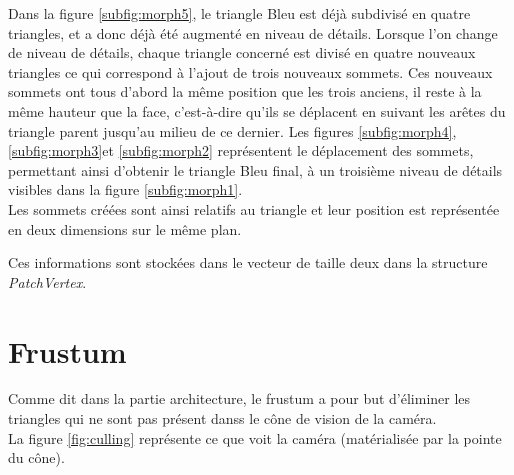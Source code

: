     Dans la figure \ref{subfig:morph5}, le triangle Bleu est déjà subdivisé en quatre triangles, et a donc déjà été augmenté en niveau de détails.
    Lorsque l'on change de niveau de détails, chaque triangle concerné est divisé en quatre nouveaux triangles ce qui correspond à l'ajout de trois nouveaux sommets. Ces nouveaux sommets ont tous d'abord la même position que les trois anciens, il reste à la même hauteur que la face, c'est-à-dire qu'ils se déplacent en suivant les arêtes du triangle parent jusqu'au milieu de ce dernier.
    Les figures \ref{subfig:morph4}, \ref{subfig:morph3}et \ref{subfig:morph2} représentent le déplacement des sommets, permettant ainsi d'obtenir le triangle Bleu final, à un troisième niveau de détails visibles dans la figure \ref{subfig:morph1}.\\
    
    Les sommets créées sont ainsi relatifs au triangle et leur position est représentée en deux dimensions sur le même plan.
  
  Ces informations sont stockées dans le vecteur de taille deux dans la structure \textit{PatchVertex}.\\
  
  
  
  
  \section{Frustum}
  
  Comme dit dans la partie architecture, le frustum a pour but d'éliminer les triangles qui ne sont pas présent danss le cône de vision de la caméra.\\
  La figure \ref{fig:culling} représente ce que voit la caméra (matérialisée par la pointe du cône).
  
